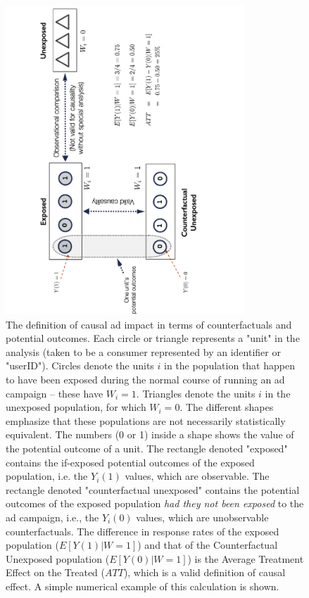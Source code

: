 \documentclass[11pt,a4paper]{article}
\theoremstyle{definition}
\theoremstyle{remark}
\theoremstyle{definition}
\theoremstyle{definition}
\theoremstyle{definition}
\theoremstyle{definition}
\theoremstyle{definition}
\theoremstyle{definition}
\begin{document}
\begin{figure}\centering
\includegraphics[width = 0.8\textwidth, angle = 270]{counterfactuals-math.pdf}
\caption{\small The definition of causal ad impact  in terms of counterfactuals and potential outcomes. 
Each circle or triangle represents a "unit" in the analysis (taken to be a consumer represented by an identifier or "userID"). 
Circles denote the units $i$ in the population that happen to have been exposed during the normal course of running an ad campaign -- these have  $W_i=1$. Triangles denote the units $i$ in the unexposed population, for which $W_i=0$. 
The different shapes emphasize that these populations are not necessarily statistically equivalent. 
The numbers (0 or 1) inside a shape shows the value of the potential outcome of a unit. 
The rectangle denoted "exposed" contains the if-exposed potential outcomes of the exposed population, i.e. the $Y_i(1)$ values, which are observable.
The rectangle denoted "counterfactual unexposed" contains the potential outcomes of the exposed population \textit{had they not been exposed} to the ad campaign, i.e.,  the $Y_i(0)$ values, which are unobservable counterfactuals. 
The difference in response rates of the exposed population ($E[ Y(1) | W=1]$) and that of the Counterfactual Unexposed population ($E[ Y(0) | W=1]$) is the Average Treatment Effect on the Treated ($ATT$), which is a valid definition of causal effect. A simple numerical example of this calculation is shown.
}
\label{fig-counterfactuals}
\end{figure}
\end{document}

